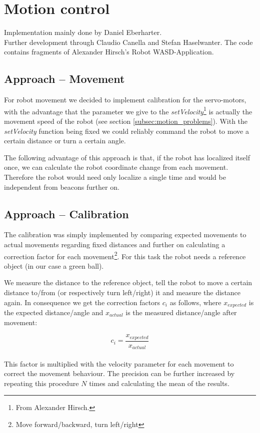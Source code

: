 \documentclass[703031]{iisreport}
\begin{document}
\section{Motion control}
\label{sec:motion}
Implementation mainly done by Daniel Eberharter.\\
Further development through Claudio Canella and Stefan Haselwanter.
The code contains fragments of Alexander Hirsch's Robot WASD-Application.

\subsection{Approach -- Movement}
For robot movement we decided to implement calibration for the servo-motors, with the advantage that the parameter we give to the \emph{setVelocity}\footnote{From Alexander Hirsch.} is actually the movement speed of the robot (see section \ref{subsec:motion_problems}). With the \emph{setVelocity} function being fixed we could reliably command the robot to move a certain distance or turn a certain angle.

The following advantage of this approach is that, if the robot has localized itself once, we can calculate the robot coordinate change from each movement. Therefore the robot would need only localize a single time and would be independent from beacons further on.

\subsection{Approach -- Calibration}
The calibration was simply implemented by comparing expected movements to actual movements regarding fixed distances and further on calculating a correction factor for each movement\footnote{Move forward/backward, turn left/right}. For this task the robot needs a reference object (in our case a green ball).

We measure the distance to the reference object, tell the robot to move a certain distance to/from (or respectively turn left/right) it and measure the distance again. In consequence
we get the correction factors $c_i$ as follows, where $x_{expected}$ is the expected distance/angle and $x_{actual}$ is the measured distance/angle after movement:

	\[c_i = \frac{x_{expected}}{x_{actual}}\]\\
This factor is multiplied with the velocity parameter for each movement to correct the movement behaviour. The precision can be further increased by repeating this procedure $N$ times and calculating the mean of the results.
\end{document}
